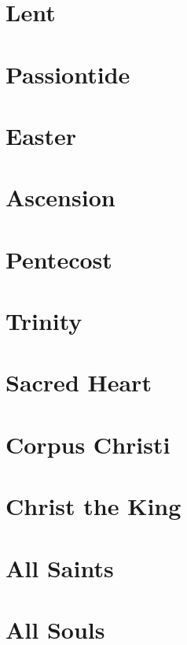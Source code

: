 \documentclass[11pt]{article} %
\begin{document}
\section{Lent}


\section{Passiontide}


\section{Easter}

\section{Ascension}

\section{Pentecost}

\section{Trinity}

\section{Sacred Heart}

\section{Corpus Christi}

\section{Christ the King}

\section{All Saints}

\section{All Souls}
\end{document}
